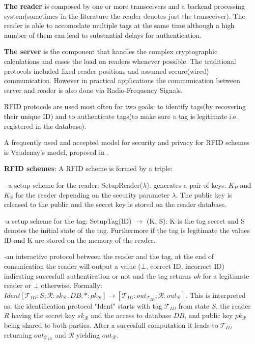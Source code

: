         \textbf{The reader} is composed by one or more transceivers and a backend processing system(sometimes in the literature the reader denotes just the transceiver). 
    The reader is able to accomodate multiple tags at the same time although a high number of them can lead to substantial delays for authentication. 
    
        \textbf{The server} is the component that handles the complex cryptographic calculations and eases the load on readers whenever possible. The traditional protocols
    included fixed reader positions and assumed secure(wired) communication. However in practical applications the communication between server and reader is also done via 
    Radio-Frequency Signals.

        RFID protocols are used most often for two goals: to identify tags(by recovering their unique ID) and to authenticate tags(to make sure a tag is legitimate i.e. registered in 
    the database). 

        A frequently used and accepted model for security and privacy for RFID schemes is Vaudenay's
    model, proposed in \cite{Vaudenay}. 

    \textbf{RFID schemes}: A RFID scheme is formed by a triple:

    - a setup scheme for the reader: SetupReader($\lambda$): generates a pair of keys: $K_P$ and 
    $K_S$ for the reader depending on the security parameter $\lambda$. The public key is released
    to the public and the secret key is stored on the reader database.

    -a setup scheme for the tag: SetupTag(ID) $\rightarrow$ (K, S): K is the tag secret and S denotes the 
    initial state of the tag. Furthermore if the tag is legitimate the values ID and K are stored
    on the memory of the reader.
    
    -an interactive protocol between the reader and the tag, at the end of comunication the reader
    will output a value ($\bot$, correct ID, incorrect ID) indicating succesfull authentication or 
    not and the tag returns $ok$ for a legitimate reader or $\bot$ otherwise. Formally:
    $Ident[\mathcal{T}_{ID}:S; \mathcal{R}: sk_{\mathcal{R}}, DB; *:pk_{\mathcal{R}}] \rightarrow 
    [\mathcal{T}_{ID}:out_{\mathcal{T}_{ID}}; \mathcal{R}:out_{\mathcal{R}}]$. This is interpreted as:
    the identification protocol "Ident" starts with tag $\mathcal{T}_{ID}$ from state $S$, the reader $R$ having the secret key 
    $sk_{\mathcal{R}}$ and the access to database $DB$, and public key $pk_{\mathcal{R}}$ being shared to both parties. After a 
    succesfull computation it leads to $\mathcal{T}_{ID}$ returning $out_{\mathcal{T}_{ID}}$ and $\mathcal{R}$ yielding $out_{\mathcal{R}}$.

